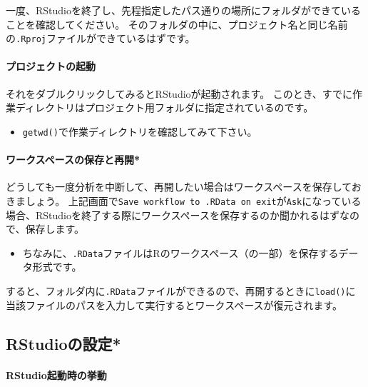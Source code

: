 \documentclass[]{bxjsreport}
\providecommand{\tightlist}{%
  \setlength{\itemsep}{0pt}\setlength{\parskip}{0pt}}
\let\oldparagraph\paragraph
\renewcommand{\paragraph}[1]{\oldparagraph{#1}\mbox{}}
\let\asdf\section
\renewcommand{\section}{\chapter}
\let\asdff\subsection
\renewcommand{\subsection}{\asdf}
\renewcommand{\subsubsection}{\asdff}
\begin{document}
一度、RStudioを終了し、先程指定したパス通りの場所にフォルダができていることを確認してください。
そのフォルダの中に、プロジェクト名と同じ名前の\texttt{.Rproj}ファイルができているはずです。

\hypertarget{ux30d7ux30edux30b8ux30a7ux30afux30c8ux306eux8d77ux52d5}{%
\paragraph{プロジェクトの起動}\label{ux30d7ux30edux30b8ux30a7ux30afux30c8ux306eux8d77ux52d5}}

それをダブルクリックしてみるとRStudioが起動されます。
このとき、すでに作業ディレクトリはプロジェクト用フォルダに指定されているのです。

\begin{itemize}
\tightlist
\item
  \texttt{getwd()}で作業ディレクトリを確認してみて下さい。
\end{itemize}

\hypertarget{ux30efux30fcux30afux30b9ux30daux30fcux30b9ux306eux4fddux5b58ux3068ux518dux958b}{%
\paragraph{ワークスペースの保存と再開*}\label{ux30efux30fcux30afux30b9ux30daux30fcux30b9ux306eux4fddux5b58ux3068ux518dux958b}}

どうしても一度分析を中断して、再開したい場合はワークスペースを保存しておきましょう。
上記画面で\texttt{Save\ workflow\ to\ .RData\ on\ exit}が\texttt{Ask}になっている場合、RStudioを終了する際にワークスペースを保存するのか聞かれるはずなので、保存します。

\begin{itemize}
\tightlist
\item
  ちなみに、\texttt{.RData}ファイルはRのワークスペース（の一部）を保存するデータ形式です。
\end{itemize}

すると、フォルダ内に\texttt{.RData}ファイルができるので、再開するときに\texttt{load()}に当該ファイルのパスを入力して実行するとワークスペースが復元されます。

\hypertarget{rstudioux306eux8a2dux5b9a}{%
\subsubsection{RStudioの設定*}\label{rstudioux306eux8a2dux5b9a}}

\hypertarget{rstudioux8d77ux52d5ux6642ux306eux6319ux52d5}{%
\paragraph{RStudio起動時の挙動}\label{rstudioux8d77ux52d5ux6642ux306eux6319ux52d5}}
\end{document}
